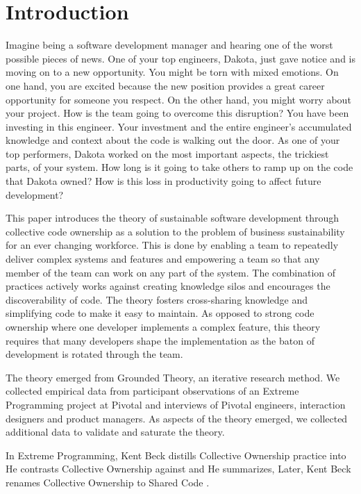\section{Introduction}

Imagine being a software development manager and hearing one of the worst possible pieces of news.  One of your top engineers, Dakota, just gave notice and is moving on to a new opportunity. You might be torn with mixed emotions. On one hand, you are excited because the new position provides a great career opportunity for someone you respect. On the other hand, you might worry about your project. How is the team going to overcome this disruption? You have been investing in this engineer. Your investment and the entire engineer's accumulated knowledge and context about the code is walking out the door.  As one of your top performers, Dakota worked on the most important aspects, the trickiest parts, of your system. How long is it going to take others to ramp up on the code that Dakota owned? How is this loss in productivity going to affect future development? 

This paper introduces the theory of sustainable software development through collective code ownership as a solution to the problem of business sustainability for an ever changing workforce. This is done by enabling a team to repeatedly deliver complex systems and features and empowering a team so that any member of the team can work on any part of the system. The combination of practices actively works against creating knowledge silos and encourages the discoverability of code. The theory fosters cross-sharing knowledge and simplifying code to make it easy to maintain. As opposed to strong code ownership where one developer implements a complex feature, this theory requires that many developers shape the implementation as the baton of development is rotated through the team.

The theory emerged from Grounded Theory, an iterative research method. We collected empirical data from participant observations of an Extreme Programming project at Pivotal and interviews of Pivotal engineers, interaction designers and product managers. As aspects of the theory emerged, we collected additional data to validate and saturate the theory.

In Extreme Programming, Kent Beck distills Collective Ownership practice into  He contrasts Collective Ownership against  and  He summarizes,   \cite{ExtremeProgramming2000} Later, Kent Beck renames Collective Ownership to Shared Code \cite{ExtremeProgramming2004}. 

